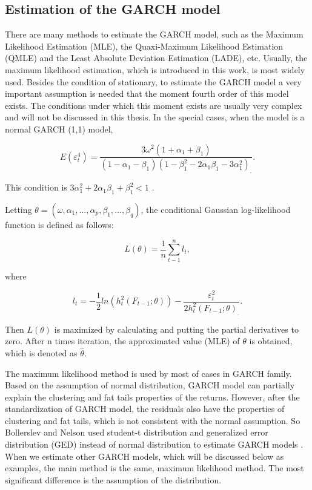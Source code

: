 \subsection{Estimation of the GARCH model}

There are many methods to estimate the GARCH model, such as the Maximum Likelihood Estimation (MLE), the Quaxi-Maximum Likelihood Estimation (QMLE) and the Least Absolute Deviation Estimation (LADE), etc. Usually, the maximum likelihood estimation, which is introduced in this work, is most widely used. Besides the condition of stationary, to estimate the GARCH model a very important assumption is needed that the moment fourth order of this model exists. The conditions under which this moment exists are usually very complex and will not be discussed in this thesis. In the special cases, when the model is a normal GARCH (1,1) model,
 
\begin{equation}
E(\varepsilon_t^4)=\frac{3\omega^2(1+\alpha_1+\beta_1)}{(1-\alpha_1-\beta_1)(1-\beta_1^2-2\alpha_1\beta_1-3\alpha_1^2)_.}.
\end{equation}

This condition is $3\alpha_1^2+2\alpha_1\beta_1+\beta_1^2<1$ \citep{Milhj2012}.  

Letting  $\theta=(\omega, \alpha_1, ..., \alpha_p,\beta_1,..., \beta_q)$, the conditional Gaussian log-likelihood function is defined as follows:

\begin{equation}
 L(\theta) = \frac{1}{n}\sum_{t-1}^nl_t,
\end{equation}

where

\begin{equation}
l_t =-\frac{1}{2}ln(h_t^2(F_{t-1};\theta))-\frac{\varepsilon_t^2}{2h_t^2(F_{t-1};\theta)_.}.
\end{equation}

Then $L(\theta)$ is maximized by calculating and putting the partial derivatives to zero. After n times iteration, the approximated value (MLE) of $\theta$ is obtained, which is denoted as $\hat{\theta}$.

The maximum likelihood method is used by most of cases in GARCH family. Based on the assumption of normal distribution, GARCH model can partially explain the clustering and fat tails properties of the returns. However, after the standardization of GARCH model, the residuals also have the properties of clustering and fat tails, which is not consistent with the normal assumption. So Bollerslev and Nelson used student-t distribution and generalized error distribution (GED) instead of normal distribution to estimate GARCH models \citep{Bollerslev1986,Nelson1991}. When we estimate other GARCH models, which will be discussed below as examples, the main method is the same, maximum likelihood method. The most significant difference is the assumption of the distribution. 


